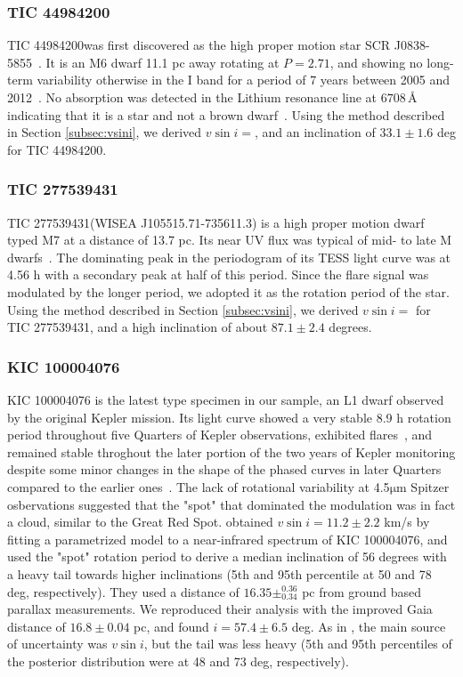 \documentclass[fleqn,usenatbib,letters]{mnras}%
\newcommand{\FA}{TIC 277539431} %
\newcommand{\FB}{TIC 44984200} %
\newcommand{\FE}{KIC 100004076} %
\begin{document}
\subsubsection{\FB}
\label{sec:propsB}
\FB\;was first discovered as the high proper motion star SCR J0838-5855~\citep{finch2007}. It is an M6 dwarf 11.1 pc away rotating at $P=2.71$, and showing no long-term variability otherwise in the I band for a period of 7 years between 2005 and 2012~\citep{hosey2015}. No absorption was detected in the Lithium resonance line at $6708$\,\AA\; indicating that it is a star and not a brown dwarf~\citep{phanbao2017}. Using the method described in Section \ref{subsec:vsini}, we derived $v\sin i=$, and an inclination of $33.1\pm1.6$ deg for \FB.
\subsubsection{\FA}
\label{sec:propsA}
\FA\;(WISEA J105515.71-735611.3) is a high proper motion dwarf~\citep{schneider2016} typed M7 at a distance of 13.7 pc. Its near UV flux was typical of mid- to late M dwarfs~\citep{schneider2018}. The dominating peak in the periodogram of its TESS light curve was at 4.56 h with a secondary peak at half of this period. Since the flare signal was modulated by the longer period, we adopted it as the rotation period of the star. Using the method described in Section \ref{subsec:vsini}, we derived $v\sin i=$ for \FA, and a high inclination of about $87.1\pm2.4$ degrees.

\subsubsection{\FE}
\label{sec:propsE}
\FE\; is the latest type specimen in our sample, an L1 dwarf observed by the original Kepler mission. Its light curve showed a very stable 8.9 h rotation period throughout five Quarters of Kepler observations, exhibited flares~\citep{gizis2013}, and remained stable throghout the later portion of the two years of Kepler monitoring despite some minor changes in the shape of the phased curves in later Quarters compared to the earlier ones~\citep{gizis2015}. The lack of rotational variability at 4.5$\mathrm{\mu}$m Spitzer osbervations suggested that the "spot" that dominated the modulation was in fact a cloud, similar to the Great Red Spot\citep{gizis2015}. \citet{gizis2013} obtained $v\sin i = 11.2\pm2.2$ km/s by fitting a parametrized model to a near-infrared spectrum of \FE, and used the "spot" rotation period to derive a median inclination of 56 degrees with a heavy tail towards higher inclinations (5th and 95th percentile at 50 and 78 deg, respectively). They used a distance of $16.35 \pm^{0.36}_{0.34}$ pc from ground based parallax measurements. We reproduced their analysis with the improved Gaia distance of $16.8\pm0.04$ pc, and found $i=57.4 \pm 6.5$ deg. As in \citet{gizis2013}, the main source of uncertainty was $v\sin i$, but the tail was less heavy (5th and 95th percentiles of the posterior distribution were at 48 and 73 deg, respectively).
\end{document}
